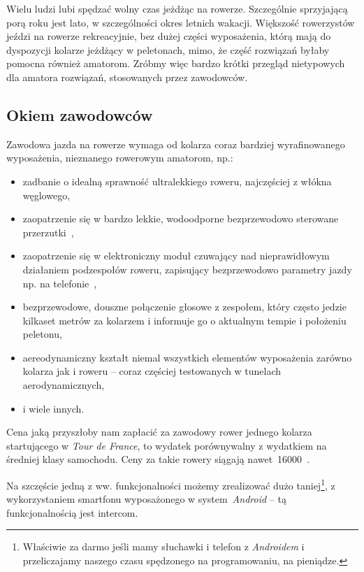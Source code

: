 \documentclass{article}
\begin{document}
Wielu ludzi lubi spędzać wolny czas jeżdżąc na rowerze. Szczególnie sprzyjającą porą roku jest lato, w szczególności okres letnich wakacji. Większość rowerzystów jeździ na rowerze rekreacyjnie, bez dużej części wyposażenia, którą mają do dyspozycji kolarze jeżdżący w peletonach, mimo, że część rozwiązań byłaby pomocna również amatorom. Zróbmy więc bardzo krótki przegląd nietypowych dla amatora rozwiązań, stosowanych przez zawodowców.


\subsection{Okiem zawodowców}

Zawodowa jazda na rowerze wymaga od kolarza coraz bardziej wyrafinowanego wyposażenia, nieznanego rowerowym amatorom, np.:
\begin{itemize}
\item zadbanie o idealną sprawność ultralekkiego roweru, najczęściej z włókna węglowego,
\item zaopatrzenie się w bardzo lekkie, wodoodporne bezprzewodowo sterowane przerzutki~\cite{www:campagnolo-shifts}\cite{www:campagnolo-shifts-video},
\item zaopatrzenie się w elektroniczny moduł czuwający nad nieprawidłowym działaniem podzespołów roweru, zapisujący bezprzewodowo parametry jazdy np. na telefonie~\cite{www:campagnolo-computer}\cite{www:campagnolo-computer-video}\cite{www:campagnolo-computer-adjustment-video},
\item bezprzewodowe, douszne połączenie głosowe z zespołem, który często jedzie kilkaset metrów za kolarzem i informuje go o aktualnym tempie i położeniu peletonu,
\item aereodynamiczny kształt niemal wszystkich elementów wyposażenia zarówno kolarza jak i roweru -- coraz częściej testowanych w tunelach aerodynamicznych,
\item i wiele innych.
\end{itemize}
Cena jaką przyszłoby nam zapłacić za zawodowy rower jednego kolarza startującego w \emph{Tour de France}, to wydatek porównywalny z wydatkiem na średniej klasy samochodu. Ceny za takie rowery siągają nawet~16000\textsterling~\cite{www:racing-bikes}\cite{www:tdf-bike}.

Na szczęście jedną z ww. funkcjonalności możemy zrealizować dużo taniej\footnote{Właściwie za darmo jeśli mamy słuchawki i telefon z \emph{Androidem} i przeliczajamy naszego czasu spędzonego na programowaniu, na pieniądze.}, z wykorzystaniem smartfonu wyposażonego w system~\emph{Android} -- tą funkcjonalnością jest intercom.
\end{document}
